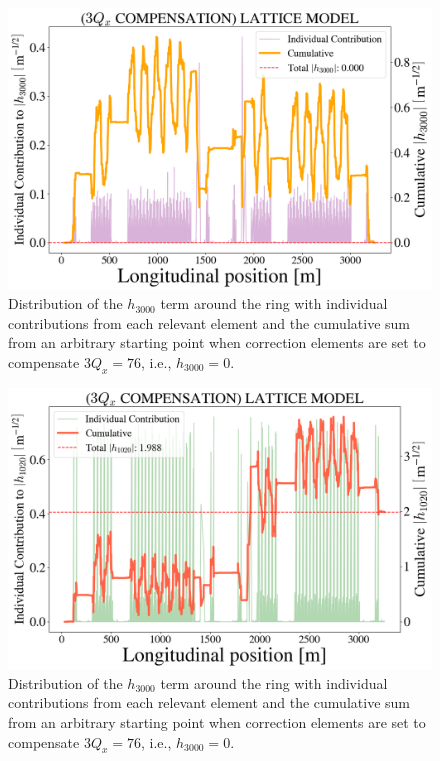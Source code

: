 \begin{figure}[H]
    \centering
    \includegraphics[width=\columnwidth]{chapter4/h3000_3qxcomp.png}
    \caption{Distribution of the $h_{3000}$ term around the ring with individual contributions from each relevant element and the cumulative sum from an arbitrary starting point when correction elements are set to compensate $3Q_x=76$, i.e., $h_{3000}=0$.}
    \label{fig:h3000_3qxcomp}
\end{figure}

\begin{figure}[H]
    \centering
    \includegraphics[width=\columnwidth]{chapter4/h1020_3qxcomp.png}
    \caption{Distribution of the $h_{3000}$ term around the ring with individual contributions from each relevant element and the cumulative sum from an arbitrary starting point when correction elements are set to compensate $3Q_x=76$, i.e., $h_{3000}=0$.}
    \label{fig:h1020_3qxcomp}
\end{figure}

